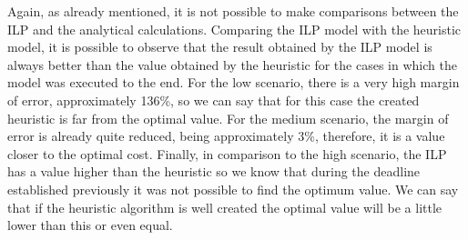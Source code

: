 \vspace{13pt}
Again, as already mentioned, it is not possible to make comparisons between the ILP and the analytical calculations. Comparing the ILP model with the heuristic model, it is possible to observe that the result obtained by the ILP model is always better than the value obtained by the heuristic for the cases in which the model was executed to the end. For the low scenario, there is a very high margin of error, approximately 136\%, so we can say that for this case the created heuristic is far from the optimal value. For the medium scenario, the margin of error is already quite reduced, being approximately 3\%, therefore, it is a value closer to the optimal cost. Finally, in comparison to the high scenario, the ILP has a value higher than the heuristic so we know that during the deadline established previously it was not possible to find the optimum value. We can say that if the heuristic algorithm is well created the optimal value will be a little lower than this or even equal.
